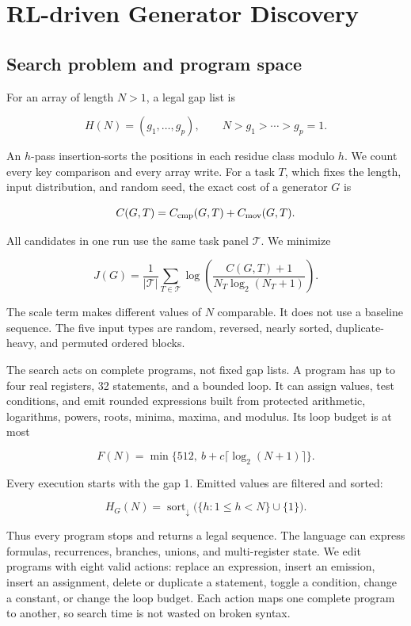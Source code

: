 \section{RL-driven Generator Discovery}
\label{sec:method}

\subsection{Search problem and program space}

For an array of length $N>1$, a legal gap list is

\[
  H(N)=(g_1,\ldots,g_p),
  \qquad N>g_1>\cdots>g_p=1.
\]

An $h$-pass insertion-sorts the positions in each residue class modulo $h$.
We count every key comparison and every array write.  For a task $T$, which
fixes the length, input distribution, and random seed, the exact cost of a
generator $G$ is

\[
  C(G,T)=C_{\rm cmp}(G,T)+C_{\rm mov}(G,T).
\]

All candidates in one run use the same task panel $\mathcal T$.  We minimize

\begin{equation}
  J(G)=\frac1{|\mathcal T|}\sum_{T\in\mathcal T}
  \log\!\left(
    \frac{C(G,T)+1}{N_T\log_2(N_T+1)}
  \right).
  \label{eq:search-objective}
\end{equation}

The scale term makes different values of $N$ comparable.  It does not use a
baseline sequence.  The five input types are random, reversed, nearly sorted,
duplicate-heavy, and permuted ordered blocks.

The search acts on complete programs, not fixed gap lists.  A program has up
to four real registers, 32 statements, and a bounded loop.  It can assign
values, test conditions, and emit rounded expressions built from protected
arithmetic, logarithms, powers, roots, minima, maxima, and modulus.  Its loop
budget is at most

\[
  F(N)=\min\{512,\ b+c\lceil\log_2(N+1)\rceil\}.
\]

Every execution starts with the gap 1.  Emitted values are filtered and sorted:

\begin{equation}
  H_G(N)=\operatorname{sort}_{\downarrow}
  \bigl(\{h:1\le h<N\}\cup\{1\}\bigr).
  \label{eq:generator-semantics}
\end{equation}

Thus every program stops and returns a legal sequence.  The language can
express formulas, recurrences, branches, unions, and multi-register state.  We
edit programs with eight valid actions: replace an expression, insert an
emission, insert an assignment, delete or duplicate a statement, toggle a
condition, change a constant, or change the loop budget.  Each action maps one
complete program to another, so search time is not wasted on broken syntax.

